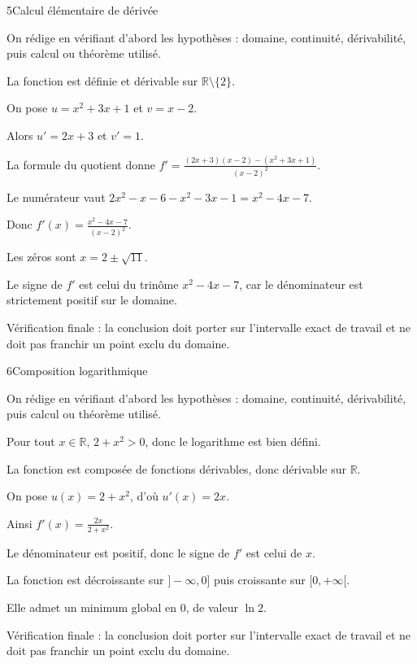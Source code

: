 \documentclass[11pt,a4paper]{article}
\newcommand{\R}{\mathbb{R}}
\begin{document}
\begin{corrbox}{5}{Calcul élémentaire de dérivée}

\begin{methodebox}
On rédige en vérifiant d'abord les hypothèses : domaine, continuité, dérivabilité, puis calcul ou théorème utilisé.
\end{methodebox}

La fonction est définie et dérivable sur $\R\setminus\{2\}$.


On pose $u=x^2+3x+1$ et $v=x-2$.


Alors $u'=2x+3$ et $v'=1$.


La formule du quotient donne $f'=\frac{(2x+3)(x-2)-(x^2+3x+1)}{(x-2)^2}$.


Le numérateur vaut $2x^2-x-6-x^2-3x-1=x^2-4x-7$.


Donc $f'(x)=\frac{x^2-4x-7}{(x-2)^2}$.


Les zéros sont $x=2\pm\sqrt{11}$.


Le signe de $f'$ est celui du trinôme $x^2-4x-7$, car le dénominateur est strictement positif sur le domaine.


\begin{attentionbox}
Vérification finale : la conclusion doit porter sur l'intervalle exact de travail et ne doit pas franchir un point exclu du domaine.
\end{attentionbox}

\end{corrbox}


\begin{corrbox}{6}{Composition logarithmique}

\begin{methodebox}
On rédige en vérifiant d'abord les hypothèses : domaine, continuité, dérivabilité, puis calcul ou théorème utilisé.
\end{methodebox}

Pour tout $x\in\R$, $2+x^2>0$, donc le logarithme est bien défini.


La fonction est composée de fonctions dérivables, donc dérivable sur $\R$.


On pose $u(x)=2+x^2$, d'où $u'(x)=2x$.


Ainsi $f'(x)=\frac{2x}{2+x^2}$.


Le dénominateur est positif, donc le signe de $f'$ est celui de $x$.


La fonction est décroissante sur $]-\infty,0]$ puis croissante sur $[0,+\infty[$.


Elle admet un minimum global en $0$, de valeur $\ln2$.


\begin{attentionbox}
Vérification finale : la conclusion doit porter sur l'intervalle exact de travail et ne doit pas franchir un point exclu du domaine.
\end{attentionbox}

\end{corrbox}
\end{document}
